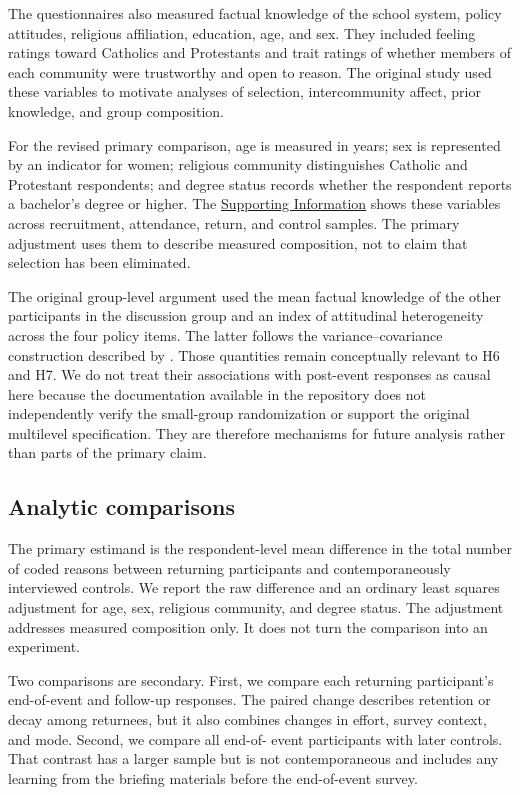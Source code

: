 \documentclass{article}
\begin{document}
The questionnaires also measured factual knowledge of the school system, policy attitudes,
religious affiliation, education, age, and sex. They included feeling ratings toward Catholics
and Protestants and trait ratings of whether members of each community were trustworthy and
open to reason. The original study used these variables to motivate analyses of selection,
intercommunity affect, prior knowledge, and group composition.

For the revised primary comparison, age is measured in years; sex is represented by an
indicator for women; religious community distinguishes Catholic and Protestant respondents;
and degree status records whether the respondent reports a bachelor's degree or higher. The
\hyperref[sec:supplement]{Supporting Information} shows these variables across recruitment, attendance, return, and
control samples. The primary adjustment uses them to describe measured composition, not to
claim that selection has been eliminated.

The original group-level argument used the mean factual knowledge of the other participants in
the discussion group and an index of attitudinal heterogeneity across the four policy items.
The latter follows the variance--covariance construction described by
\citet{anderson2003introduction}.
Those quantities remain conceptually relevant to H6 and H7. We do not treat their associations
with post-event responses as causal here because the documentation available in the repository
does not independently verify the small-group randomization or support the original multilevel
specification. They are therefore mechanisms for future analysis rather than parts of the
primary claim.

\subsection{Analytic comparisons}

The primary estimand is the respondent-level mean difference in the total number of coded
reasons between returning participants and contemporaneously interviewed controls. We report
the raw difference and an ordinary least squares adjustment for age, sex, religious community,
and degree status. The adjustment addresses measured composition only. It does not turn the
comparison into an experiment.

Two comparisons are secondary. First, we compare each returning participant's end-of-event
and follow-up responses. The paired change describes retention or decay among returnees, but
it also combines changes in effort, survey context, and mode. Second, we compare all end-of-
event participants with later controls. That contrast has a larger sample but is not
contemporaneous and includes any learning from the briefing materials before the end-of-event
survey.
\end{document}
